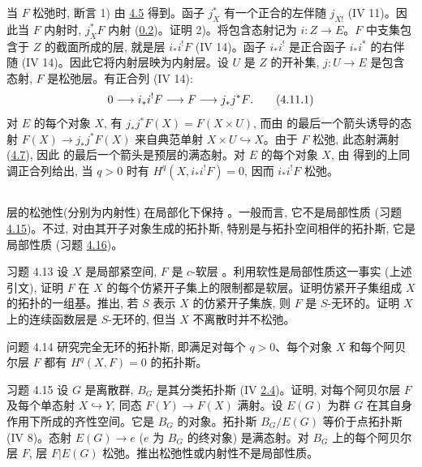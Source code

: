 当 $F$ 松弛时, 断言 1) 由 \hyperref[V.cor4.5]{4.5} 得到。函子 $j_X^\ast$ 有一个正合的左伴随 $j_{X!}$ (IV 11)。因此当 $F$ 内射时, $j_X^\ast F$ 内射 (\hyperref[V.prop0.2]{0.2})。证明 2)。将包含态射记为 $i:Z\to E$。$F$ 中支集包含于 $Z$ 的截面所成的层, 就是层 $i_\ast i^{!}F$ (IV 14)。函子 $i_\ast i^{!}$ 是正合函子 $i_\ast i^\ast$ 的右伴随 (IV 14)。因此它将内射层映为内射层。设 $U$ 是 $Z$ 的开补集, $j:U\to E$ 是包含态射, $F$ 是松弛层。有正合列 (IV 14):
\begin{equation*}
0\to i_\ast i^{!}F\to F\to j_\ast j^\ast F{\quoi}.\tag{4.11.1}
\end{equation*}
对 $E$ 的每个对象 $X$, 有 $j_\ast j^\ast F(X)=F(X\times U)$, 而由  的最后一个箭头诱导的态射 $F(X)\to j_\ast j^\ast F(X)$ 来自典范单射 $X\times U\hookrightarrow X$。由于 $F$ 松弛, 此态射满射 (\hyperref[V.prop4.7]{4.7}), 因此  的最后一个箭头是预层的满态射。对 $E$ 的每个对象 $X$, 由  得到的上同调正合列给出, 当 $q>0$ 时有 $H^q(X,i_\ast i^{!}F)=0$, 因而 $i_\ast i^{!}F$ 松弛。

\setcounter{subsection}{11}
\subsection{}
层的松弛性\pageoriginale (分别为内射性) 在局部化下保持 。一般而言, 它不是局部性质 (习题 \hyperref[V.exer4.15]{4.15})。不过, 对由其开子对象生成的拓扑斯, 特别是与拓扑空间相伴的拓扑斯, 它是局部性质 (习题 \hyperref[V.exer4.16]{4.16})。

\begin{enonce*}[remark]{习题 4.13}
设 $X$ 是局部紧空间, $F$ 是 $c$-软层 \cite{sga4.exp.V.bib.7}。利用软性是局部性质这一事实 (上述引文), 证明 $F$ 在 $X$ 的每个仿紧开子集上的限制都是软层。证明仿紧开子集组成 $X$ 的拓扑的一组基。推出, 若 $S$ 表示 $X$ 的仿紧开子集族, 则 $F$ 是 $S$-无环的。证明 $X$ 上的连续函数层是 $S$-无环的, 但当 $X$ 不离散时并不松弛。
\end{enonce*}

\begin{enonce*}[remark]{问题 4.14}
研究完全无环的拓扑斯, 即满足对每个 $q>0$、每个对象 $X$ 和每个阿贝尔层 $F$ 都有 $H^q(X,F)=0$ 的拓扑斯。
\end{enonce*}

\begin{enonce*}[remark]{习题 4.15}
设 $G$ 是离散群, $B_G$ 是其分类拓扑斯 (IV \hyperref[IV.subsec2.4]{2.4})。证明, 对每个阿贝尔层 $F$ 及每个单态射 $X\hookrightarrow Y$, 同态 $F(Y)\to F(X)$ 满射。设 $E(G)$ 为群 $G$ 在其自身作用下所成的齐性空间。它是 $B_G$ 的对象。拓扑斯 $B_G/E(G)$ 等价于点拓扑斯 (IV 8)。态射 $E(G)\to e$ ($e$ 为 $B_G$ 的终对象) 是满态射。对 $B_G$ 上的每个阿贝尔层 $F$, 层 $F|E(G)$ 松弛。推出松弛性或内射性不是局部性质。
\end{enonce*}

